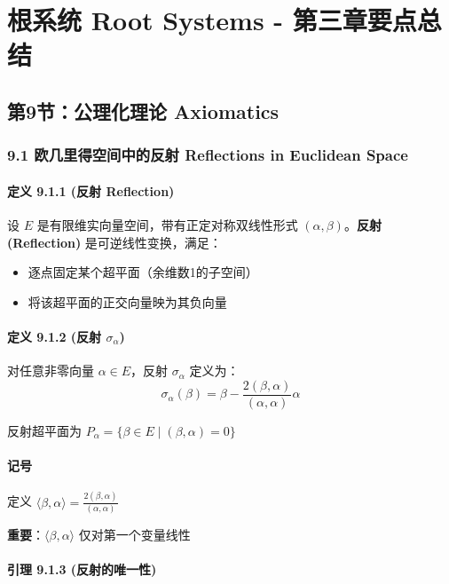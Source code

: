 \chapter{根系统 Root Systems - 第三章要点总结}

\section{第9节：公理化理论 Axiomatics}

\subsection{9.1 欧几里得空间中的反射 Reflections in Euclidean Space}

\subsubsection{定义 9.1.1 (反射 Reflection)}

设 $E$ 是有限维实向量空间，带有正定对称双线性形式 $(\alpha, \beta)$。\textbf{反射 (Reflection)} 是可逆线性变换，满足：

\begin{itemize}
	\item 逐点固定某个超平面（余维数1的子空间）
	\item 将该超平面的正交向量映为其负向量
\end{itemize}

\subsubsection{定义 9.1.2 (反射 \texorpdfstring{$\sigma_\alpha$}{sigma_alpha})}

对任意非零向量 $\alpha \in E$，反射 $\sigma_\alpha$ 定义为：
\[
\sigma_\alpha(\beta) = \beta - \frac{2(\beta, \alpha)}{(\alpha, \alpha)} \alpha
\]

反射超平面为 $P_\alpha = \{\beta \in E \mid (\beta, \alpha) = 0\}$

\subsubsection{记号}

定义 $\langle\beta, \alpha\rangle = \frac{2(\beta, \alpha)}{(\alpha, \alpha)}$

\textbf{重要}：$\langle\beta, \alpha\rangle$ 仅对第一个变量线性

\subsubsection{引理 9.1.3 (反射的唯一性)}

